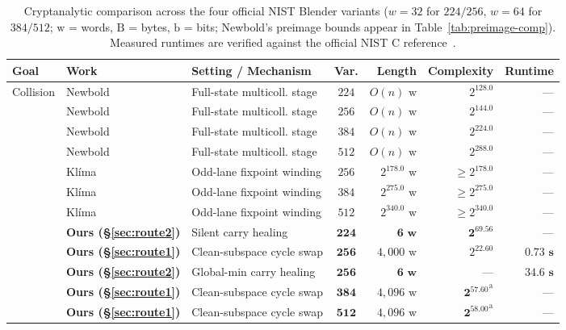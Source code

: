 \documentclass[11pt,a4paper]{article}
\theoremstyle{definition}
\theoremstyle{remark}
\begin{document}
\begin{table}[t]
\centering
\caption{Cryptanalytic comparison across the four official NIST Blender variants ($w = 32$ for $224/256$, $w = 64$ for $384/512$; $\text{w}$ = words, $\text{B}$ = bytes, $\text{b}$ = bits; Newbold's preimage bounds appear in Table~\ref{tab:preimage-comp}). Measured runtimes are verified against the official NIST C reference~\cite{Bra08}.}
\label{tab:overview}
\footnotesize
\setlength{\tabcolsep}{3.4pt}
\renewcommand{\arraystretch}{1.04}
\begin{tabular}{@{}lllcrrr@{}}
\toprule
\textbf{Goal} & \textbf{Work} & \textbf{Setting / Mechanism} & \textbf{Var.} & \textbf{Length} & \textbf{Complexity} & \textbf{Runtime} \\
\midrule
\multirow{12}{*}{Collision}
 & Newbold~\cite{New08} & Full-state multicoll. stage & $224$ & $O(n)\text{ w}$ & $2^{128.0}$ & --- \\
 & Newbold~\cite{New08} & Full-state multicoll. stage & $256$ & $O(n)\text{ w}$ & $2^{144.0}$ & --- \\
 & Newbold~\cite{New08} & Full-state multicoll. stage & $384$ & $O(n)\text{ w}$ & $2^{224.0}$ & --- \\
 & Newbold~\cite{New08} & Full-state multicoll. stage & $512$ & $O(n)\text{ w}$ & $2^{288.0}$ & --- \\
 & Kl\'{i}ma~\cite{Kli09} & Odd-lane fixpoint winding & $256$ & $2^{178.0}\text{ w}$ & $\ge 2^{178.0}$ & --- \\
 & Kl\'{i}ma~\cite{Kli09} & Odd-lane fixpoint winding & $384$ & $2^{275.0}\text{ w}$ & $\ge 2^{275.0}$ & --- \\
 & Kl\'{i}ma~\cite{Kli09} & Odd-lane fixpoint winding & $512$ & $2^{340.0}\text{ w}$ & $\ge 2^{340.0}$ & --- \\
 & \textbf{Ours (\S\ref{sec:route2})} & Silent carry healing & $\mathbf{224}$ & $\mathbf{6\text{ w}}$ & $\mathbf{2^{69.56}}$ & --- \\
 & \textbf{Ours (\S\ref{sec:route1})} & Clean-subspace cycle swap & $\mathbf{256}$ & $4{,}000\text{ w}$ & $2^{22.60}$ & $\mathbf{0.73\text{ s}}$ \\
 & \textbf{Ours (\S\ref{sec:route2})} & Global-min carry healing & $\mathbf{256}$ & $\mathbf{6\text{ w}}$ & --- & $\mathbf{34.6\text{ s}}$ \\
 & \textbf{Ours (\S\ref{sec:route1})} & Clean-subspace cycle swap & $\mathbf{384}$ & $4{,}096\text{ w}$ & $\mathbf{2^{57.60}}^{\mathrm{a}}$ & --- \\
 & \textbf{Ours (\S\ref{sec:route1})} & Clean-subspace cycle swap & $\mathbf{512}$ & $4{,}096\text{ w}$ & $\mathbf{2^{58.00}}^{\mathrm{a}}$ & --- \\

\end{tabular}
\end{table}
\end{document}
